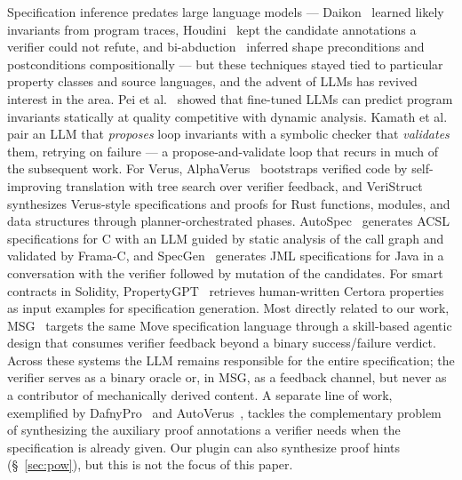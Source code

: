 Specification inference predates large language models --- Daikon~\cite{DaikonTSE01} learned likely invariants from program traces, Houdini~\cite{Houdini01} kept the candidate annotations a verifier could not refute, and bi-abduction~\cite{BiAbduction09} inferred shape preconditions and postconditions compositionally --- but these techniques stayed tied to particular property classes and source languages, and the advent of LLMs has revived interest in the area.
Pei et al.~\cite{PeiEtAl23} showed that fine-tuned LLMs can predict program invariants statically at quality competitive with dynamic analysis.
Kamath et al.~\cite{KamathEtAl23} pair an LLM that \emph{proposes} loop invariants with a symbolic checker that \emph{validates} them, retrying on failure --- a propose-and-validate loop that recurs in much of the subsequent work.
For Verus, AlphaVerus~\cite{AlphaVerus} bootstraps verified code by self-improving translation with tree search over verifier feedback, and VeriStruct~\cite{VeriStruct26} synthesizes Verus-style specifications and proofs for Rust functions, modules, and data structures through planner-orchestrated phases.
AutoSpec~\cite{AutoSpec24} generates ACSL specifications for C with an LLM guided by static analysis of the call graph and validated by Frama-C, and SpecGen~\cite{SpecGen25} generates JML specifications for Java in a conversation with the verifier followed by mutation of the candidates.
For smart contracts in Solidity, PropertyGPT~\cite{PropertyGPT25} retrieves human-written Certora properties as input examples for specification generation.
Most directly related to our work, MSG~\cite{MSG25} targets the same Move specification language through a skill-based agentic design that consumes verifier feedback beyond a binary success/failure verdict.
Across these systems the LLM remains responsible for the entire specification; the verifier serves as a binary oracle or, in MSG, as a feedback channel, but never as a contributor of mechanically derived content.
A separate line of work, exemplified by DafnyPro~\cite{DafnyPro26} and AutoVerus~\cite{AutoVerus25}, tackles the complementary problem of synthesizing the auxiliary proof annotations a verifier needs when the specification is already given. Our plugin can also synthesize proof hints (\S~\ref{sec:pow}), but this is not the focus of this paper.

